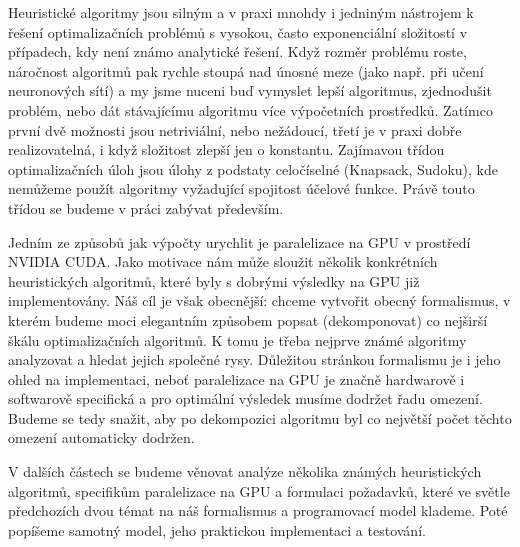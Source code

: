 

Heuristické algoritmy jsou silným a v praxi mnohdy i jedniným nástrojem k řešení optimalizačních problémů s vysokou, často exponenciální složitostí v případech, kdy není známo analytické řešení. Když rozměr problému roste, náročnost algoritmů pak rychle stoupá nad únosné meze (jako např. při učení neuronových sítí) a my jsme nuceni buď vymyslet lepší algoritmus, zjednodušit problém, nebo dát stávajícímu algoritmu více výpočetních prostředků. Zatímco první dvě možnosti jsou netriviální, nebo nežádoucí, třetí je v praxi dobře realizovatelná, i když složitost zlepší jen o konstantu. Zajímavou třídou optimalizačních úloh jsou úlohy z podstaty celočíselné (Knapsack, Sudoku), kde nemůžeme použít algoritmy vyžadující spojitost účelové funkce. Právě touto třídou se budeme v práci zabývat především.


Jedním ze způsobů jak výpočty urychlit je paralelizace na GPU v prostředí NVIDIA CUDA. Jako motivace nám může sloužit několik konkrétních heuristických algoritmů, které byly s dobrými výsledky na GPU již implementovány. Náš cíl je však obecnější: chceme vytvořit obecný formalismus, v kterém budeme moci elegantním způsobem popsat (dekomponovat) co nejširší škálu optimalizačních algoritmů. K tomu je třeba nejprve známé algoritmy analyzovat a hledat jejich společné rysy. Důležitou stránkou formalismu je i jeho ohled na implementaci, neboť paralelizace na GPU je značně hardwarově i softwarově specifická a pro optimální výsledek musíme dodržet řadu omezení. Budeme se tedy snažit, aby po dekompozici algoritmu byl co největší počet těchto omezení automaticky dodržen.



V dalších částech se budeme věnovat analýze několika známých heuristických algoritmů, specifikům paralelizace na GPU a formulaci požadavků, které ve světle předchozích dvou témat na náš formalismus a programovací model klademe. Poté popíšeme samotný model, jeho praktickou implementaci a testování. 
